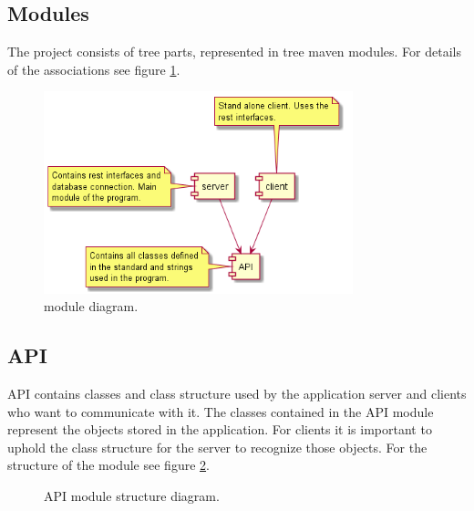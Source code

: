 \documentclass[10pt]{article}
\begin{document}
\subsection{Modules}
The project consists of tree parts, represented in tree maven modules. For details of the associations see figure \ref{fig:moduleuml}.
\begin{figure}[b]
\centering
\includegraphics[width=0.8\textwidth]{uml/modulesuml.png}
\caption{module diagram.}
\label{fig:moduleuml}
\end{figure}
\subsection{API}
API contains classes and class structure used by the application server and clients who want to communicate with it. The classes contained in the API module represent the objects stored in the application. For clients it is important to uphold the class structure for the server to recognize those objects. For the structure of the module see figure \ref{fig:apiuml}.
\begin{figure}[b]
\centering
{}
\caption{API module structure diagram.}
\label{fig:apiuml}
\end{figure}
\end{document}
